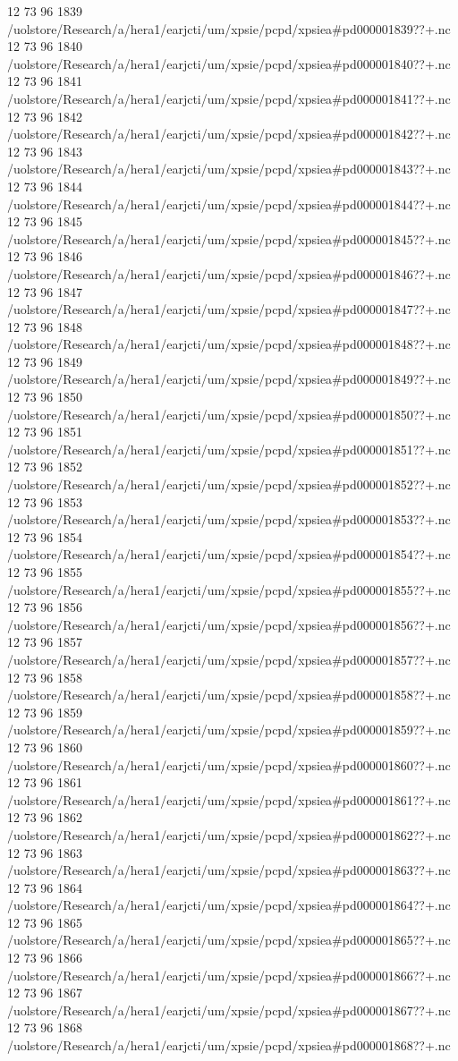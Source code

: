 12 73 96
1839
/uolstore/Research/a/hera1/earjcti/um/xpsie/pcpd/xpsiea#pd000001839??+.nc
12 73 96
1840
/uolstore/Research/a/hera1/earjcti/um/xpsie/pcpd/xpsiea#pd000001840??+.nc
12 73 96
1841
/uolstore/Research/a/hera1/earjcti/um/xpsie/pcpd/xpsiea#pd000001841??+.nc
12 73 96
1842
/uolstore/Research/a/hera1/earjcti/um/xpsie/pcpd/xpsiea#pd000001842??+.nc
12 73 96
1843
/uolstore/Research/a/hera1/earjcti/um/xpsie/pcpd/xpsiea#pd000001843??+.nc
12 73 96
1844
/uolstore/Research/a/hera1/earjcti/um/xpsie/pcpd/xpsiea#pd000001844??+.nc
12 73 96
1845
/uolstore/Research/a/hera1/earjcti/um/xpsie/pcpd/xpsiea#pd000001845??+.nc
12 73 96
1846
/uolstore/Research/a/hera1/earjcti/um/xpsie/pcpd/xpsiea#pd000001846??+.nc
12 73 96
1847
/uolstore/Research/a/hera1/earjcti/um/xpsie/pcpd/xpsiea#pd000001847??+.nc
12 73 96
1848
/uolstore/Research/a/hera1/earjcti/um/xpsie/pcpd/xpsiea#pd000001848??+.nc
12 73 96
1849
/uolstore/Research/a/hera1/earjcti/um/xpsie/pcpd/xpsiea#pd000001849??+.nc
12 73 96
1850
/uolstore/Research/a/hera1/earjcti/um/xpsie/pcpd/xpsiea#pd000001850??+.nc
12 73 96
1851
/uolstore/Research/a/hera1/earjcti/um/xpsie/pcpd/xpsiea#pd000001851??+.nc
12 73 96
1852
/uolstore/Research/a/hera1/earjcti/um/xpsie/pcpd/xpsiea#pd000001852??+.nc
12 73 96
1853
/uolstore/Research/a/hera1/earjcti/um/xpsie/pcpd/xpsiea#pd000001853??+.nc
12 73 96
1854
/uolstore/Research/a/hera1/earjcti/um/xpsie/pcpd/xpsiea#pd000001854??+.nc
12 73 96
1855
/uolstore/Research/a/hera1/earjcti/um/xpsie/pcpd/xpsiea#pd000001855??+.nc
12 73 96
1856
/uolstore/Research/a/hera1/earjcti/um/xpsie/pcpd/xpsiea#pd000001856??+.nc
12 73 96
1857
/uolstore/Research/a/hera1/earjcti/um/xpsie/pcpd/xpsiea#pd000001857??+.nc
12 73 96
1858
/uolstore/Research/a/hera1/earjcti/um/xpsie/pcpd/xpsiea#pd000001858??+.nc
12 73 96
1859
/uolstore/Research/a/hera1/earjcti/um/xpsie/pcpd/xpsiea#pd000001859??+.nc
12 73 96
1860
/uolstore/Research/a/hera1/earjcti/um/xpsie/pcpd/xpsiea#pd000001860??+.nc
12 73 96
1861
/uolstore/Research/a/hera1/earjcti/um/xpsie/pcpd/xpsiea#pd000001861??+.nc
12 73 96
1862
/uolstore/Research/a/hera1/earjcti/um/xpsie/pcpd/xpsiea#pd000001862??+.nc
12 73 96
1863
/uolstore/Research/a/hera1/earjcti/um/xpsie/pcpd/xpsiea#pd000001863??+.nc
12 73 96
1864
/uolstore/Research/a/hera1/earjcti/um/xpsie/pcpd/xpsiea#pd000001864??+.nc
12 73 96
1865
/uolstore/Research/a/hera1/earjcti/um/xpsie/pcpd/xpsiea#pd000001865??+.nc
12 73 96
1866
/uolstore/Research/a/hera1/earjcti/um/xpsie/pcpd/xpsiea#pd000001866??+.nc
12 73 96
1867
/uolstore/Research/a/hera1/earjcti/um/xpsie/pcpd/xpsiea#pd000001867??+.nc
12 73 96
1868
/uolstore/Research/a/hera1/earjcti/um/xpsie/pcpd/xpsiea#pd000001868??+.nc
